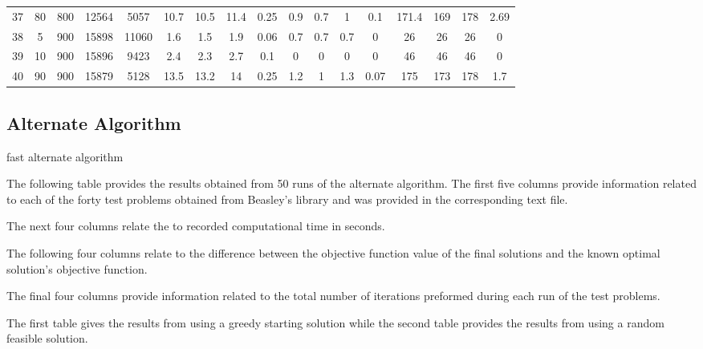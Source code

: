 \documentclass[11pt]{article}
\begin{document}
\begin{appendices}
\begin{landscape}
\begin{longtable}[c]{ccccc|cccc|cccc|cccc}
				37 & 80 & 800 & 12564 & 5057 & 10.7 & 10.5 & 11.4 & 0.25 & 0.9 & 0.7 & 1 & 0.1 & 171.4 & 169 & 178 & 2.69 \\
				\rowcolor[HTML]{EFEFEF} 
				38 & 5 & 900 & 15898 & 11060 & 1.6 & 1.5 & 1.9 & 0.06 & 0.7 & 0.7 & 0.7 & 0 & 26 & 26 & 26 & 0 \\
				\rowcolor[HTML]{EFEFEF} 
				39 & 10 & 900 & 15896 & 9423 & 2.4 & 2.3 & 2.7 & 0.1 & 0 & 0 & 0 & 0 & 46 & 46 & 46 & 0 \\
				\rowcolor[HTML]{EFEFEF} 
				40 & 90 & 900 & 15879 & 5128 & 13.5 & 13.2 & 14 & 0.25 & 1.2 & 1 & 1.3 & 0.07 & 175 & 173 & 178 & 1.7
			\end{longtable}
		\end{landscape}
		
		\subsection{Alternate Algorithm}
		\index[terms]fast {alternate algorithm}
		
		The following table provides the results obtained from 50 runs of the alternate algorithm.  The first five columns provide information related to each of the forty test problems obtained from Beasley's library \cite{BEAS90} and was provided in the corresponding text file.
		
		The next four columns relate the to recorded computational time in seconds.
		
		The following four columns relate to the difference between the objective function value of the final solutions and the known optimal solution's objective function.
		
		The final four columns provide information related to the total number of iterations preformed during each run of the test problems.
		
		The first table gives the results from using a greedy starting solution while the second table provides the results from using a random feasible solution.
		

\end{appendices}
\end{document}
